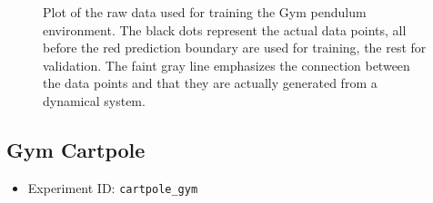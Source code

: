 \begin{figure}
			\caption{Plot of the raw data used for training the Gym pendulum environment. The black dots represent the actual data points, all before the red prediction boundary are used for training, the rest for validation. The faint gray line emphasizes the connection between the data points and that they are actually generated from a dynamical system.}
			\label{fig:envPendulumGym}
		\end{figure}

	\subsection{Gym Cartpole}
		\begin{itemize}
			\item Experiment ID: \texttt{cartpole\_gym}
		\end{itemize}

